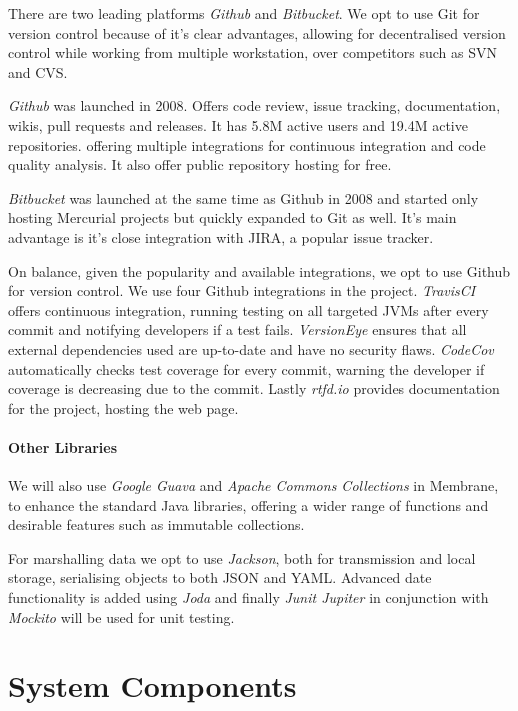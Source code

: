\documentclass[11pt, a4paper, twocolumn, twoside]{report}
\begin{document}
There are two leading platforms \emph{Github} and \emph{Bitbucket}. We opt to use Git for version control because of it's clear advantages, allowing for decentralised version control while working from multiple workstation, over competitors such as SVN and CVS.

\emph{Github} was launched in 2008. Offers code review, issue tracking, documentation, wikis, pull requests and releases. It has 5.8M active users and 19.4M active repositories. \citep{github2016octoverse} offering multiple integrations for continuous integration and code quality analysis. It also offer public repository hosting for free.

\emph{Bitbucket} was launched at the same time as Github in 2008 and started only hosting Mercurial projects but quickly expanded to Git as well. \citep{bitbucket2017site} It's main advantage is it's close integration with JIRA, a popular issue tracker. \citep{upguard2014gitvbit}

On balance, given the popularity and available integrations, we opt to use Github for version control. We use four Github integrations in the project. \emph{TravisCI} offers continuous integration, running testing on all targeted JVMs after every commit and notifying developers if a test fails. \emph{VersionEye} ensures that all external dependencies used are up-to-date and have no security flaws. \emph{CodeCov} automatically checks test coverage for every commit, warning the developer if coverage is decreasing due to the commit. Lastly \emph{rtfd.io} provides documentation for the project, hosting the web page.

\subsubsection{Other Libraries}

We will also use \emph{Google Guava} and \emph{Apache Commons Collections} in Membrane, to enhance the standard Java libraries, offering a wider range of functions and desirable features such as immutable collections.

For marshalling data we opt to use \emph{Jackson}, both for transmission and local storage, serialising objects to both JSON and YAML. Advanced date functionality is added using \emph{Joda} and finally \emph{Junit Jupiter} in conjunction with \emph{Mockito} will be used for unit testing.

\chapter{System Components}
\end{document}

